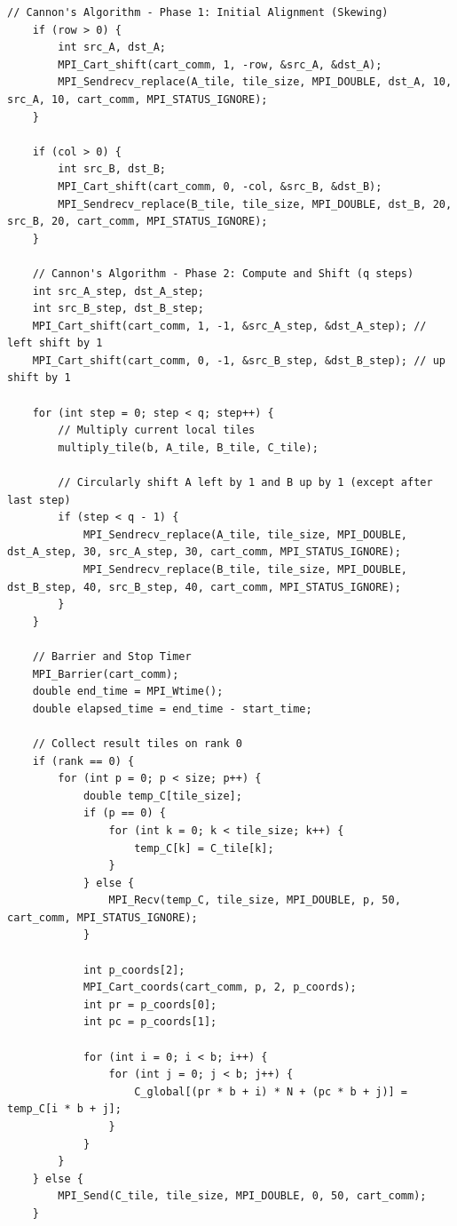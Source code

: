 \documentclass[12pt]{article}
\begin{document}
\begin{lstlisting}[style=code]
    // Cannon's Algorithm - Phase 1: Initial Alignment (Skewing)
    if (row > 0) {
        int src_A, dst_A;
        MPI_Cart_shift(cart_comm, 1, -row, &src_A, &dst_A);
        MPI_Sendrecv_replace(A_tile, tile_size, MPI_DOUBLE, dst_A, 10, src_A, 10, cart_comm, MPI_STATUS_IGNORE);
    }

    if (col > 0) {
        int src_B, dst_B;
        MPI_Cart_shift(cart_comm, 0, -col, &src_B, &dst_B);
        MPI_Sendrecv_replace(B_tile, tile_size, MPI_DOUBLE, dst_B, 20, src_B, 20, cart_comm, MPI_STATUS_IGNORE);
    }

    // Cannon's Algorithm - Phase 2: Compute and Shift (q steps)
    int src_A_step, dst_A_step;
    int src_B_step, dst_B_step;
    MPI_Cart_shift(cart_comm, 1, -1, &src_A_step, &dst_A_step); // left shift by 1
    MPI_Cart_shift(cart_comm, 0, -1, &src_B_step, &dst_B_step); // up shift by 1

    for (int step = 0; step < q; step++) {
        // Multiply current local tiles
        multiply_tile(b, A_tile, B_tile, C_tile);

        // Circularly shift A left by 1 and B up by 1 (except after last step)
        if (step < q - 1) {
            MPI_Sendrecv_replace(A_tile, tile_size, MPI_DOUBLE, dst_A_step, 30, src_A_step, 30, cart_comm, MPI_STATUS_IGNORE);
            MPI_Sendrecv_replace(B_tile, tile_size, MPI_DOUBLE, dst_B_step, 40, src_B_step, 40, cart_comm, MPI_STATUS_IGNORE);
        }
    }

    // Barrier and Stop Timer
    MPI_Barrier(cart_comm);
    double end_time = MPI_Wtime();
    double elapsed_time = end_time - start_time;

    // Collect result tiles on rank 0
    if (rank == 0) {
        for (int p = 0; p < size; p++) {
            double temp_C[tile_size];
            if (p == 0) {
                for (int k = 0; k < tile_size; k++) {
                    temp_C[k] = C_tile[k];
                }
            } else {
                MPI_Recv(temp_C, tile_size, MPI_DOUBLE, p, 50, cart_comm, MPI_STATUS_IGNORE);
            }

            int p_coords[2];
            MPI_Cart_coords(cart_comm, p, 2, p_coords);
            int pr = p_coords[0];
            int pc = p_coords[1];

            for (int i = 0; i < b; i++) {
                for (int j = 0; j < b; j++) {
                    C_global[(pr * b + i) * N + (pc * b + j)] = temp_C[i * b + j];
                }
            }
        }
    } else {
        MPI_Send(C_tile, tile_size, MPI_DOUBLE, 0, 50, cart_comm);
    }


\end{lstlisting}
\end{document}
